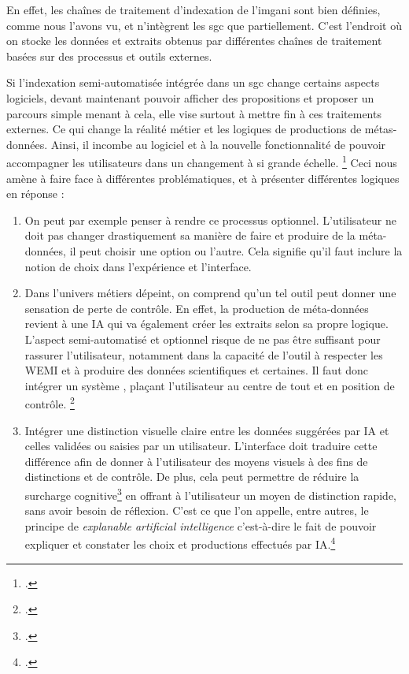 En effet, les chaînes de traitement d'indexation de l'\gls{imgani} sont bien définies, comme nous l'avons vu, et n'intègrent les \gls{sgc} que partiellement. C'est l'endroit où on stocke les données et extraits obtenus par différentes chaînes de traitement basées sur des processus et outils externes.

\label{changement} Si l'indexation semi-automatisée intégrée dans un \gls{sgc} change certains aspects logiciels, devant maintenant pouvoir afficher des propositions et proposer un parcours simple menant à cela, elle vise surtout à mettre fin à ces traitements externes. Ce qui change la réalité métier et les logiques de productions de métas-données. Ainsi, il incombe au logiciel et à la nouvelle fonctionnalité de pouvoir accompagner les utilisateurs dans un changement à si grande échelle. \footcite{baddaTechnologyAcceptanceModel2025} Ceci nous amène à faire face à différentes problématiques, et à présenter différentes logiques en réponse : 

\begin{enumerate}
	\item On peut par exemple penser à rendre ce processus optionnel. L'utilisateur ne doit pas changer drastiquement sa manière de faire et produire de la méta-données, il peut choisir une option ou l'autre. Cela signifie qu'il faut inclure la notion de choix dans l'expérience et l'interface. 
	
	\item Dans l'univers métiers dépeint, on comprend qu'un tel outil peut donner une sensation de perte de contrôle. En effet, la production de méta-données revient à une \gls{IA} qui va également créer les extraits selon sa propre logique. L'aspect semi-automatisé et optionnel risque de ne pas être suffisant pour rassurer l'utilisateur, notamment dans la capacité de l'outil à respecter les \gls{WEMI} et à produire des données scientifiques et certaines. Il faut donc intégrer un système , plaçant l'utilisateur au centre de tout et en position de contrôle. \footcite{amershiGuidelinesHumanAIInteraction2019}

	\item Intégrer une distinction visuelle claire entre les données suggérées par \gls{IA} et celles validées ou saisies par un utilisateur. L'interface doit traduire cette différence afin de donner à l'utilisateur des moyens visuels à des fins de distinctions et de contrôle. De plus, cela peut permettre de réduire la surcharge cognitive\footcite{paasCognitiveLoadTheory2010} en offrant à l'utilisateur un moyen de distinction rapide, sans avoir besoin de réflexion. C'est ce que l'on appelle, entre autres, le principe de \textit{explanable artificial intelligence} c'est-à-dire le fait de pouvoir expliquer et constater les choix et productions effectués par \gls{IA}.\footcite{liaoHumanCenteredExplainableAI2022}

\end{enumerate}


